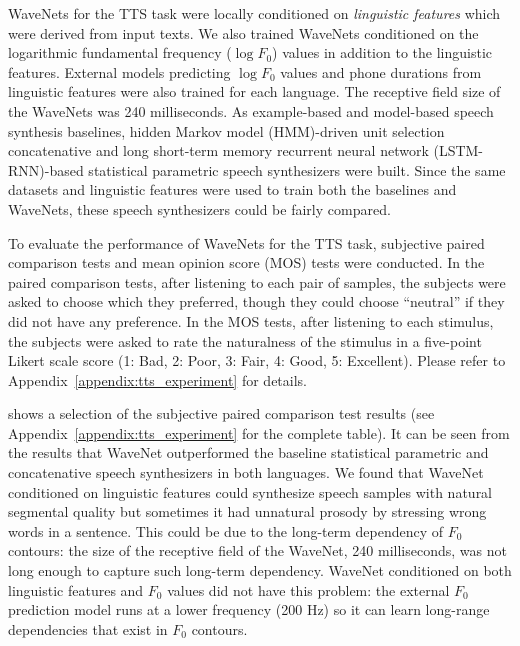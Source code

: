 WaveNets for the TTS task were locally conditioned on \emph{linguistic features} which were derived from input texts.
We also trained WaveNets conditioned on the logarithmic fundamental frequency ($\log F_0$) values in addition to the linguistic features.
External models predicting $\log F_0$ values and phone durations from linguistic features were also trained for each language.
The receptive field size of the WaveNets was 240 milliseconds.
As example-based and model-based speech synthesis baselines, hidden Markov model (HMM)-driven unit selection concatenative \citep{Xavi_Barracuda_interspeech}
and long short-term memory recurrent neural network (LSTM-RNN)-based statistical parametric \citep{Zen_LSTMprod_Interspeech} speech synthesizers were built.
Since the same datasets and linguistic features were used to train both the baselines and WaveNets, these speech synthesizers could be fairly compared.

To evaluate the performance of WaveNets for the TTS task, subjective paired comparison tests and mean opinion score (MOS) tests were conducted.
In the paired comparison tests, after listening to each pair of samples, the subjects were asked to choose which they preferred, though they could choose ``neutral'' if they did not have any preference.
In the MOS tests, after listening to each stimulus, the subjects were asked to rate the naturalness of the stimulus in a five-point Likert scale score (1: Bad, 2: Poor, 3: Fair, 4: Good, 5: Excellent).
Please refer to Appendix~\ref{appendix:tts_experiment} for details.

 shows a selection of the subjective paired comparison test results (see  Appendix~\ref{appendix:tts_experiment} for the complete table).
It can be seen from the results that WaveNet outperformed the baseline statistical parametric and concatenative speech synthesizers in both languages.
We found that WaveNet conditioned on linguistic features could synthesize speech samples with natural segmental quality but sometimes it had unnatural prosody by stressing wrong words in a sentence.
This could be due to the long-term dependency of $F_0$ contours: the size of the receptive field of the WaveNet, 240 milliseconds, was not long enough to capture such long-term dependency.  
WaveNet conditioned on both linguistic features and $F_0$ values did not have this problem: the external $F_0$ prediction model runs at a lower frequency (200 Hz) so it can learn long-range dependencies that exist in $F_0$ contours.
 
